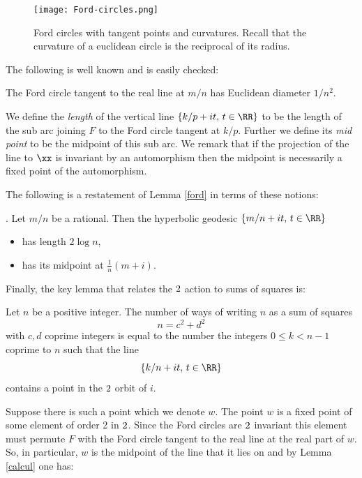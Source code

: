   \begin{figure}[ht]
\begin{center}
\texttt{[image: Ford-circles.png]} 
\end{center}
\caption{Ford circles with tangent points and curvatures.
Recall that the curvature of a euclidean circle is the reciprocal of its radius.}
\end{figure}

The following is well known and is easily checked:

\begin{lem}\label{ford}
The Ford circle tangent to the real line at $m/n$
has Euclidean diameter $1/n^2$.
\end{lem}


We define the \textit{length} of the vertical line 
$\{ k/p + i t,\, t \in \RR \}$
to be the length of the  sub arc joining 
$F$ to the Ford circle tangent at $k/p$.
Further we define its  \textit{mid point} to be the midpoint of this sub arc.
We remark that if the projection of the line to $\xx$
is invariant by an automorphism 
then the midpoint is necessarily a fixed point of the automorphism.

The following is a restatement of Lemma \ref{ford} in terms of these notions:

\begin{lem}.\label{calcul}
Let $m/n$ be a rational. 
Then the hyperbolic  geodesic $\{ m/n + i t,\, t \in \RR \}$
\begin{itemize}
\item has  length $2\log n$,
\item has its midpoint at $ \frac{1 }{n}(m + i).$
\end{itemize}
\end{lem}

Finally, the key lemma that relates the $\sl2$ action to sums of squares is:

\begin{lem} \label{squares}
Let $n$ be a positive integer.
The number of  ways of writing $n$  as a  sum of squares
$$n = c^2 + d^2$$
with $c,d$ coprime integers
is equal to the number the  integers $0 \leq k < n-1$ coprime to $n$
such that the line
$$\{  k/n + i t,\, t \in \RR \}$$
contains  a point in the $\sl2$  orbit of $i$.
\end{lem}


\proof  Suppose there is such  a point which we denote  $w$.
The point $w$ is a fixed point of some  element of order 2 in $\sl2$.
Since the Ford circles are $\sl2$ invariant
this element must permute $F$ with the Ford circle tangent 
to the real line  at the real part of $w$.
So, in particular, $w$ is the midpoint of the line 
that it lies on 
and by  Lemma \ref{calcul} one has:

